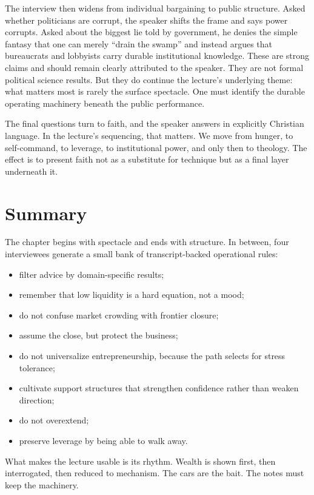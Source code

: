 The interview then widens from individual bargaining to public structure. Asked whether politicians are corrupt, the speaker shifts the frame and says power corrupts. Asked about the biggest lie told by government, he denies the simple fantasy that one can merely ``drain the swamp'' and instead argues that bureaucrats and lobbyists carry durable institutional knowledge. These are strong claims and should remain clearly attributed to the speaker. They are not formal political science results. But they do continue the lecture's underlying theme: what matters most is rarely the surface spectacle. One must identify the durable operating machinery beneath the public performance.

The final questions turn to faith, and the speaker answers in explicitly Christian language. In the lecture's sequencing, that matters. We move from hunger, to self-command, to leverage, to institutional power, and only then to theology. The effect is to present faith not as a substitute for technique but as a final layer underneath it.

\section{Summary}

The chapter begins with spectacle and ends with structure. In between, four interviewees generate a small bank of transcript-backed operational rules:
\begin{itemize}
\item filter advice by domain-specific results;
\item remember that low liquidity is a hard equation, not a mood;
\item do not confuse market crowding with frontier closure;
\item assume the close, but protect the business;
\item do not universalize entrepreneurship, because the path selects for stress tolerance;
\item cultivate support structures that strengthen confidence rather than weaken direction;
\item do not overextend;
\item preserve leverage by being able to walk away.
\end{itemize}

What makes the lecture usable is its rhythm. Wealth is shown first, then interrogated, then reduced to mechanism. The cars are the bait. The notes must keep the machinery.